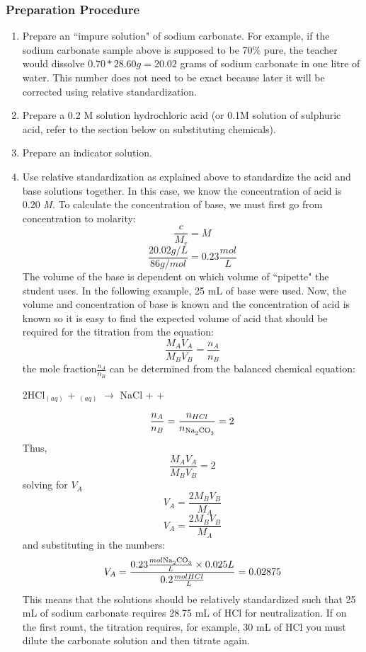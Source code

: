 \subsubsection{Preparation Procedure}
\begin{enumerate}
\item{Prepare an ``impure solution" of sodium carbonate. For example, if the sodium carbonate sample above is supposed to be 70\% pure, the teacher would dissolve $0.70*28.60g=20.02$ grams of sodium carbonate in one litre of water.  This number does not need to be exact because later it will be corrected using relative standardization.}
\item{Prepare a 0.2 M solution hydrochloric acid (or 0.1M solution of sulphuric acid, refer to the section below on substituting chemicals).}
\item{Prepare an indicator solution.}
\item{Use relative standardization as explained above to standardize the acid and base solutions together. In this case, we know the concentration of acid is 0.20 \textit{M}. To calculate the concentration of base, we must first go from concentration to molarity: 
$$\frac{c}{M_r}=M$$
$$\frac{20.02 g/L}{86g/mol}=0.23\frac{mol}{L}$$
The volume of the base is dependent on which volume of ``pipette" the student uses. In the following example, 25 mL of base were used. Now, the volume and concentration of base is known and the concentration of acid is known so it is easy to find the expected volume of acid that should be required for the titration from the equation:
$$\frac{M_A V_A}{M_B V_B}=\frac{n_A}{n_B}$$
the mole fraction$\frac{n_A}{n_B}$  can be determined from the balanced chemical equation: 

2HCl$_(aq)$ + $_(aq)$ $\longrightarrow$ NaCl +  + 

$$\frac{n_A}{n_B}=\frac{n_{HCl}}{n_{\ce{Na2CO3}}}=2$$
Thus,
$$\frac{M_A V_A}{M_B V_B}=2$$
solving for $V_A$
$$V_A=\frac{2 M_B V_B}{M_A}$$
$$V_A=\frac{2 M_B V_B}{M_A}$$
and substituting in the numbers: 
$$V_A=\frac{0.23 \frac{mol \ce{Na2CO3}}{L} \times 0.025L}{0.2\frac{mol HCl}{L}}=0.02875$$
This means that the solutions should be relatively standardized such that 25 mL of sodium carbonate requires 28.75 mL of HCl for neutralization. If on the first rount, the titration requires, for example, 30 mL of HCl you must dilute the carbonate solution and then titrate again.}
\end{enumerate}

